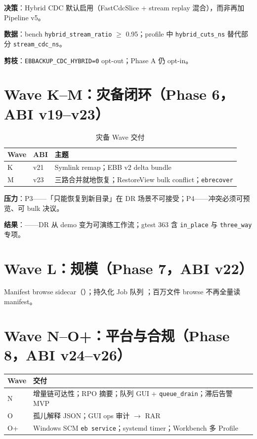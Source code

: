 \textbf{决策}：Hybrid CDC 默认启用（FastCdcSlice + stream replay 混合），而非再加 Pipeline v5。

\textbf{数据}：bench \texttt{hybrid\_stream\_ratio} $\geq$ 0.95；profile 中 \texttt{hybrid\_cuts\_ns} 替代部分 \texttt{stream\_cdc\_ns}。

\textbf{剪枝}：\texttt{EBBACKUP\_CDC\_HYBRID=0} opt-out；Phase A 仍 opt-in。

\section{Wave K--M：灾备闭环（Phase 6，ABI v19--v23）}

\begin{table}[htbp]
\centering
\caption{灾备 Wave 交付}
\small
\begin{tabular}{@{}llp{7cm}@{}}
\toprule
Wave & ABI & 主题 \\
\midrule
K & v21 & Symlink remap；EBB v2 delta bundle \\
M & v23 & 三路合并就地恢复；RestoreView bulk conflict；\texttt{ebrecover} \\
\bottomrule
\end{tabular}
\end{table}

\textbf{压力}：P3——「只能恢复到新目录」在 DR 场景不可接受；P4——冲突必须可预览、可 bulk 决议。

\textbf{结果}：——DR 从 demo 变为可演练工作流；gtest 363 含 \texttt{in\_place} 与 \texttt{three\_way} 专项。

\section{Wave L：规模（Phase 7，ABI v22）}

Manifest browse sidecar（）；持久化 Job 队列 ；百万文件 browse 不再全量读 manifest。

\section{Wave N--O+：平台与合规（Phase 8，ABI v24--v26）}

\begin{longtable}{@{}lp{10cm}@{}}
\toprule
Wave & 交付 \\
\midrule
N & 增量链可达性；RPO 摘要；队列 GUI + \texttt{queue\_drain}；滞后告警 MVP \\
O & 孤儿解释 JSON；GUI ops 审计 $\rightarrow$ RAR \\
O+ & Windows SCM \texttt{eb service}；systemd timer；Workbench 多 Profile \\
\bottomrule
\end{longtable}

